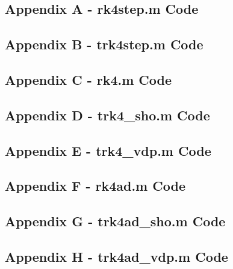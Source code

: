 \documentclass[10pt]{article}
\begin{document}

\subsection*{Appendix A - rk4step.m Code}

\pagebreak

\subsection*{Appendix B - trk4step.m Code}

\pagebreak

\subsection*{Appendix C - rk4.m Code}

\pagebreak

\subsection*{Appendix D - trk4\_sho.m Code}

\pagebreak

\subsection*{Appendix E - trk4\_vdp.m Code}

\pagebreak

\subsection*{Appendix F - rk4ad.m Code}

\pagebreak

\subsection*{Appendix G - trk4ad\_sho.m Code}

\pagebreak

\subsection*{Appendix H - trk4ad\_vdp.m Code}

\pagebreak
\end{document}
